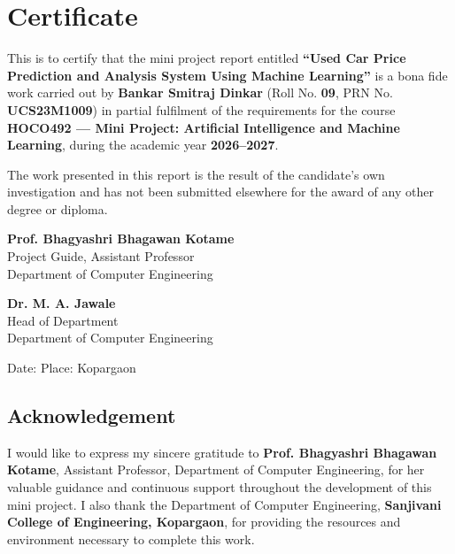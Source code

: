 \documentclass[12pt,a4paper]{report}
\begin{document}
\chapter*{Certificate}
\thispagestyle{empty}

This is to certify that the mini project report entitled \textbf{``Used Car
Price Prediction and Analysis System Using Machine Learning''} is a bona
fide work carried out by \textbf{Bankar Smitraj Dinkar} (Roll No.
\textbf{09}, PRN No. \textbf{UCS23M1009}) in partial fulfilment of the
requirements for the course \textbf{HOCO492 --- Mini Project: Artificial
Intelligence and Machine Learning}, during the academic year
\textbf{2026--2027}.

The work presented in this report is the result of the candidate's own
investigation and has not been submitted elsewhere for the award of any
other degree or diploma.

\vspace{1.6cm}
\begin{minipage}[t]{0.45\linewidth}
\textbf{Prof. Bhagyashri Bhagawan Kotame}\\
Project Guide, Assistant Professor\\
Department of Computer Engineering
\end{minipage}
\hfill
\begin{minipage}[t]{0.45\linewidth}
\textbf{Dr. M. A. Jawale}\\
Head of Department\\
Department of Computer Engineering
\end{minipage}

\vspace{1.6cm}
\noindent Date: \underline{\hspace{4cm}} \hfill Place: Kopargaon

\vspace{1cm}
\section*{Acknowledgement}
I would like to express my sincere gratitude to \textbf{Prof. Bhagyashri
Bhagawan Kotame}, Assistant Professor, Department of Computer Engineering,
for her valuable guidance and continuous support throughout the
development of this mini project. I also thank the Department of Computer
Engineering, \textbf{Sanjivani College of Engineering, Kopargaon}, for
providing the resources and environment necessary to complete this work.
\end{document}
